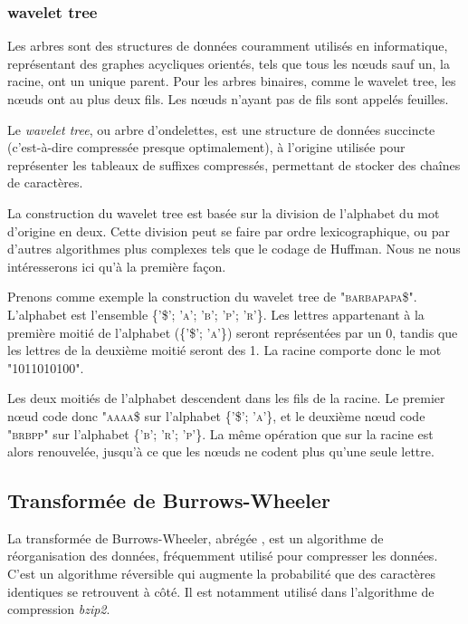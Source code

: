 \subsubsection{wavelet tree}
Les arbres sont des structures de données couramment utilisés en informatique, représentant des graphes acycliques orientés, tels que tous les nœuds sauf un, la racine, ont un unique parent. Pour les arbres binaires, comme le wavelet tree, les nœuds ont au plus deux fils. Les nœuds n'ayant pas de fils sont appelés feuilles.

Le \textit{wavelet tree}, ou arbre d'ondelettes, est une structure de données succincte (c'est-à-dire compressée presque optimalement), à l'origine utilisée pour représenter les tableaux de suffixes compressés, permettant de stocker des chaînes de caractères.

La construction du wavelet tree est basée sur la division de l'alphabet du mot d'origine en deux. Cette division peut se faire par ordre lexicographique, ou par d'autres algorithmes plus complexes tels que le codage de Huffman. Nous ne nous intéresserons ici qu'à la première façon.

Prenons comme exemple la construction du wavelet tree de \textsc{"barbapapa\$"}. L'alphabet est l'ensemble \textsc{\{'\$'; 'a'; 'b'; 'p'; 'r'\}}. Les lettres appartenant à la première moitié de l'alphabet (\textsc{\{'\$'; 'a'\}}) seront représentées par un 0, tandis que les lettres de la deuxième moitié seront des 1. La racine comporte donc le mot "1011010100".

Les deux moitiés de l'alphabet descendent dans les fils de la racine. Le premier nœud code donc \textsc{"aaaa\$} sur l'alphabet \textsc{\{'\$'; 'a'\}}, et le deuxième nœud code \textsc{"brbpp"} sur l'alphabet \textsc{\{'b'; 'r'; 'p'\}}. La même opération que sur la racine est alors renouvelée, jusqu'à ce que les nœuds ne codent plus qu'une seule lettre.


\subsection{Transformée de Burrows-Wheeler}

La transformée de Burrows-Wheeler, abrégée \bwt, est un algorithme de réorganisation des données, fréquemment utilisé pour compresser les données. C'est un algorithme réversible qui augmente la probabilité que des caractères identiques se retrouvent à côté. Il est notamment utilisé dans l'algorithme de compression \emph{bzip2}. 

